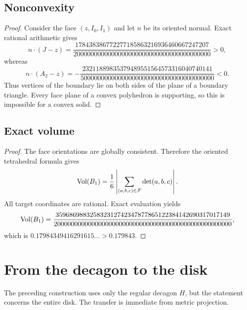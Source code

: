 \subsection{Nonconvexity}

\begin{proof}
Consider the face $(z,I_0,I_1)$ and let $n$ be its oriented normal.  Exact rational arithmetic gives
\[
n\cdot(J-z)=
\frac{178438386772277185863216936460667247207}
{2000000000000000000000000000000000000000}>0,
\]
whereas
\[
n\cdot(A_2-z)=
-\frac{23211889835379489551564573316040740141}
{500000000000000000000000000000000000000}<0.
\]
Thus vertices of the boundary lie on both sides of the plane of a boundary triangle.  Every face plane of a convex polyhedron is supporting, so this is impossible for a convex solid.
\end{proof}

\subsection{Exact volume}

\begin{proof}
The face orientations are globally consistent.  Therefore the oriented tetrahedral formula gives
\[
\operatorname{Vol}(B_1)=\frac16\left|\sum_{(a,b,c)\in\mathcal F}\det(a,b,c)\right|.
\]
All target coordinates are rational.  Exact evaluation yields
\[
\operatorname{Vol}(B_1)=
\frac{
359686988325832312742347877865122384142690317017149
}{
2000000000000000000000000000000000000000000000000000
},
\]
which is $0.17984349416291615\ldots>0.179843$.
\end{proof}

\section{From the decagon to the disk}\label{sec:disk}
The preceding construction uses only the regular decagon $H$, but the statement concerns the entire disk.  The transfer is immediate from metric projection.


